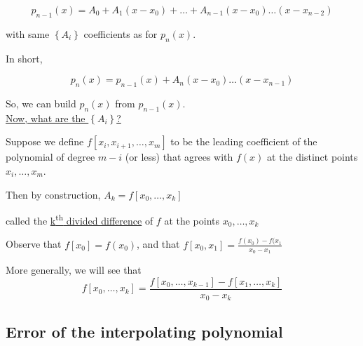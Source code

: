 \begin{equation*}
    p_{n-1}(x) = A_0 + A_1(x-x_0) + \dots + A_{n-1}(x-x_0)\dots(x-x_{n-2})
\end{equation*}

with same $\left\{A_i\right\}$ coefficients as for $p_n(x)$. 

In short,

\begin{equation*}
    p_n(x) = p_{n-1}(x) + A_n(x-x_0)\dots(x-x_{n-1})
\end{equation*}

So, we can build $p_n(x)$ from $p_{n-1}(x)$. \\
 
\underline{Now, what are the $\left\{A_i\right\}$?} 

Suppose we define $f\left[x_i,x_{i+1},\dots,x_m\right]$ to be the leading coefficient of the polynomial of degree $m-i$ (or less) that agrees with $f(x)$ at the distinct points $x_i, \dots, x_m$.

Then by construction, $A_k = f[x_0, \dots , x_k]$
\vspace{-.2cm} 
\begin{figure}[H]
    \hspace{5.9cm}
    
    \label{fig:polynomial-3}
\end{figure}
\vspace{-.5cm} 
{
\hspace{4.2cm}
called the \underline{k\textsuperscript{th} divided difference} of $f$ at the points $x_0, \dots, x_k$
}

Observe that $f[x_0] = f(x_0)$, and that $f[x_0,x_1] = \frac{f(x_0)-f(x_1}{x_0-x_1}$

More generally, we will see that 
\begin{equation*}
    f[x_0, \dots, x_k] = \frac{f[x_0, \dots, x_{k-1}] - f[x_1, \dots, x_k]}{x_0 - x_k}
\end{equation*}





\subsection{Error of the interpolating polynomial}

\begin{figure}
  \centering
  \label{}
  \caption{}
  
\end{figure}
\begin{figure}
  \centering
  \label{}
  \caption{}
  
\end{figure}
